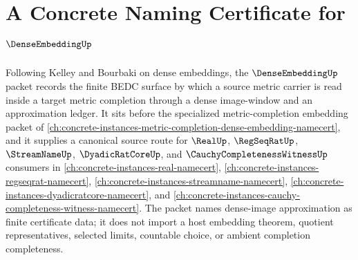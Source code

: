 \chapter{A Concrete Naming Certificate for $\DenseEmbeddingUp$}
\label{ch:concrete-instances-dense-embedding-namecert}

Following Kelley and Bourbaki on dense embeddings, the $\DenseEmbeddingUp$ packet records the finite BEDC surface by which a source metric carrier is read inside a target metric completion through a dense image-window and an approximation ledger. It sits before the specialized metric-completion embedding packet of \autoref{ch:concrete-instances-metric-completion-dense-embedding-namecert}, and it supplies a canonical source route for $\RealUp$, $\RegSeqRatUp$, $\StreamNameUp$, $\DyadicRatCoreUp$, and $\CauchyCompletenessWitnessUp$ consumers in \autoref{ch:concrete-instances-real-namecert}, \autoref{ch:concrete-instances-regseqrat-namecert}, \autoref{ch:concrete-instances-streamname-namecert}, \autoref{ch:concrete-instances-dyadicratcore-namecert}, and \autoref{ch:concrete-instances-cauchy-completeness-witness-namecert}. The packet names dense-image approximation as finite certificate data; it does not import a host embedding theorem, quotient representatives, selected limits, countable choice, or ambient completion completeness.

